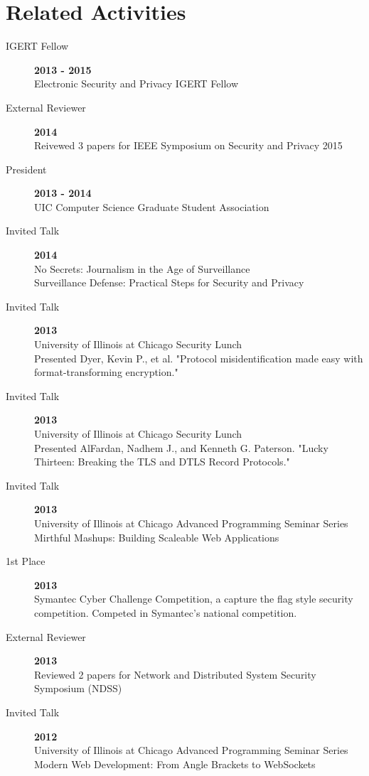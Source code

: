 \documentclass{vitae}
\begin{document}
  \section{Related Activities}
  \begin{description}
    \item[IGERT Fellow] \hfill \textbf{2013 - 2015}\\
    Electronic Security and Privacy IGERT Fellow

    \item[External Reviewer] \hfill \textbf{2014}\\
    Reivewed 3 papers for IEEE Symposium on Security and Privacy 2015

    \item[President] \hfill \textbf{2013 - 2014}\\
    UIC Computer Science Graduate Student Association

    \item[Invited Talk] \hfill \textbf{2014}\\
    No Secrets: Journalism in the Age of Surveillance\\
    Surveillance Defense: Practical Steps for Security and Privacy

    \item[Invited Talk] \hfill \textbf{2013}\\
    University of Illinois at Chicago Security Lunch\\
    Presented Dyer, Kevin P., et al. "Protocol misidentification made easy with format-transforming encryption."

    \item[Invited Talk] \hfill \textbf{2013}\\
    University of Illinois at Chicago Security Lunch\\
    Presented AlFardan, Nadhem J., and Kenneth G. Paterson. "Lucky Thirteen: Breaking the TLS and DTLS Record Protocols."

    \item[Invited Talk] \hfill \textbf{2013}\\
    University of Illinois at Chicago Advanced Programming Seminar Series\\
    Mirthful Mashups: Building Scaleable Web Applications

    \item[1st Place] \hfill \textbf{2013}\\
    Symantec Cyber Challenge Competition, a capture the flag style security competition.  Competed in Symantec's national competition.

    \item[External Reviewer] \hfill \textbf{2013}\\
    Reviewed 2 papers for Network and Distributed System Security Symposium (NDSS)

    \item[Invited Talk] \hfill \textbf{2012}\\
    University of Illinois at Chicago Advanced Programming Seminar Series\\
    Modern Web Development: From Angle Brackets to WebSockets
  \end{description}
\end{document}
